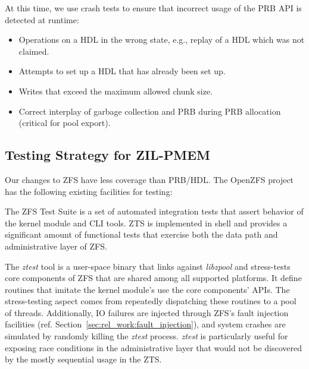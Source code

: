 \documentclass[12pt,a4paper,twoside]{book}
\begin{document}
At this time, we use crash tests to ensure that incorrect usage of the PRB API is detected at runtime:
\begin{itemize}[noitemsep]
    \item Operations on a HDL in the wrong state, e.g., replay of a HDL which was not claimed.
    \item Attempts to set up a HDL that has already been set up.
    \item Writes that exceed the maximum allowed chunk size.
    \item Correct interplay of garbage collection and PRB during PRB allocation (critical for pool export).
\end{itemize}

\subsection{Testing Strategy for ZIL-PMEM}\label{sec:eval:correctness:zilpmem}

Our changes to ZFS have less coverage than PRB/HDL.
The OpenZFS project has the following existing facilities for testing:
\begin{description}[noitemsep]
    \item[ZFS Test Suite (ZTS)] The ZFS Test Suite is a set of automated integration tests that assert behavior of the kernel module and CLI tools.
        ZTS is implemented in shell and provides a significant amount of functional tests that exercise both the data path and administrative layer of ZFS.
    \item[ztest] The \textit{ztest} tool is a user-space binary that links against \textit{libzpool} and stress-tests core components of ZFS that are shared among all supported platforms.
        It define routines that imitate the kernel module's use the core components' APIs.
        The stress-testing aspect comes from repeatedly dispatching these routines to a pool of threads.
        Additionally, IO failures are injected through ZFS's fault injection facilities (ref. Section~\ref{sec:rel_work:fault_injection}), and system crashes are simulated by randomly killing the \textit{ztest} process.
        \textit{ztest} is particularly useful for exposing race conditions in the administrative layer that would not be discovered by the mostly sequential usage in the ZTS.
\end{description}
\end{document}
